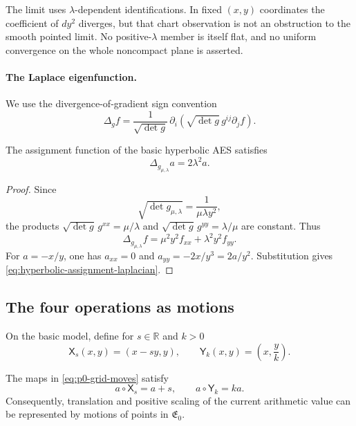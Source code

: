 The limit uses $\lambda$-dependent identifications.  In fixed $(x,y)$
coordinates the coefficient of $dy^2$ diverges, but that chart observation
is not an obstruction to the smooth pointed limit.  No positive-$\lambda$
member is itself flat, and no uniform convergence on the whole noncompact
plane is asserted.

\paragraph{The Laplace eigenfunction.}
We use the divergence-of-gradient sign convention
\begin{equation}\label{eq:laplacian-sign-convention}
 \Delta_g f
 =\frac1{\sqrt{\det g}}\,
  \partial_i\!\left(\sqrt{\det g}\,g^{ij}\partial_jf\right).
\end{equation}

\begin{proposition}\label{prop:laplace-eigenfunction}
The assignment function of the basic hyperbolic AES satisfies
\begin{equation}\label{eq:hyperbolic-assignment-laplacian}
 \Delta_{g_{\mu,\lambda}}a=2\lambda^2a.
\end{equation}
\end{proposition}

\begin{proof}
Since
\[
 \sqrt{\det g_{\mu,\lambda}}=\frac1{\mu\lambda y^2},
\]
the products
$\sqrt{\det g}\,g^{xx}=\mu/\lambda$ and
$\sqrt{\det g}\,g^{yy}=\lambda/\mu$ are constant.  Thus
\[
 \Delta_{g_{\mu,\lambda}}f
 =\mu^2y^2 f_{xx}+\lambda^2y^2 f_{yy}.
\]
For $a=-x/y$, one has $a_{xx}=0$ and
$a_{yy}=-2x/y^3=2a/y^2$.  Substitution gives
\eqref{eq:hyperbolic-assignment-laplacian}.
\end{proof}

\subsection{The four operations as motions}

On the basic model, define for $s\in\mathbb R$ and $k>0$
\begin{equation}\label{eq:p0-grid-moves}
  \mathsf X_s(x,y)=(x-sy,y),
  \qquad
  \mathsf Y_k(x,y)=\left(x,\frac yk\right).
\end{equation}

\begin{proposition}
\label{prop:p0-grid-assignment-action}
The maps in \eqref{eq:p0-grid-moves} satisfy
\[
  a\circ\mathsf X_s=a+s,
  \qquad
  a\circ\mathsf Y_k=ka.
\]
Consequently, translation and positive scaling of the current arithmetic value
can be represented by motions of points in $\mathfrak E_0$.
\end{proposition}

